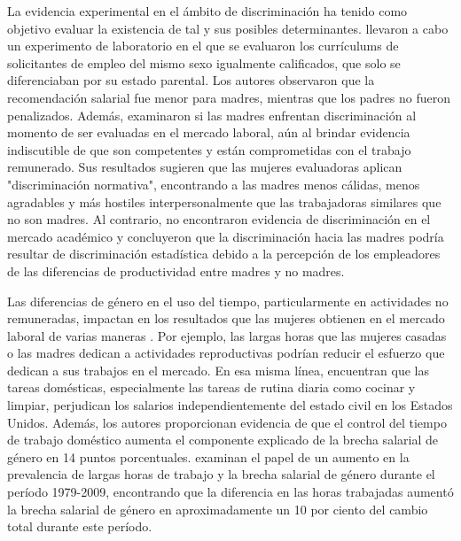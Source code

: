 La evidencia experimental en el ámbito de discriminación ha tenido como objetivo evaluar la existencia de tal y sus posibles determinantes. \citet{Correll2007} llevaron a cabo un experimento de laboratorio en el que se evaluaron los currículums de solicitantes de empleo del mismo sexo igualmente calificados, que solo se diferenciaban por su estado parental. Los autores observaron que la recomendación salarial fue menor para madres, mientras que los padres no fueron penalizados. Además, \citet{Benard2010} examinaron si las madres enfrentan discriminación al momento de ser evaluadas en el mercado laboral, aún al brindar evidencia indiscutible de que son competentes y están comprometidas con el trabajo remunerado. Sus resultados sugieren que las mujeres evaluadoras aplican "discriminación normativa", encontrando a las madres menos cálidas, menos agradables y más hostiles interpersonalmente que las trabajadoras similares que no son madres. Al contrario, \citet{Williams2015} no encontraron evidencia de discriminación en el mercado académico y concluyeron que la discriminación hacia las madres podría resultar de discriminación estadística debido a la percepción de los empleadores de las diferencias de productividad entre madres y no madres.

Las diferencias de género en el uso del tiempo, particularmente en actividades no remuneradas, impactan en los resultados que las mujeres obtienen en el mercado laboral de varias maneras \citep{Becker1985,Blau2017}. Por ejemplo, las largas horas que las mujeres casadas o las madres dedican a actividades reproductivas podrían reducir el esfuerzo que dedican a sus trabajos en el mercado. En esa misma línea, \citet{Hersch2002} encuentran que las tareas domésticas, especialmente las tareas de rutina diaria como cocinar y limpiar, perjudican los salarios independientemente del estado civil en los Estados Unidos. Además, los autores proporcionan evidencia de que el control del tiempo de trabajo doméstico aumenta el componente explicado de la brecha salarial de género en 14 puntos porcentuales. \citet{Cha2014} examinan el papel de un aumento en la prevalencia de largas horas de trabajo y la brecha salarial de género durante el período 1979-2009, encontrando que la diferencia en las horas trabajadas aumentó la brecha salarial de género en aproximadamente un 10 por ciento del cambio total durante este período.
